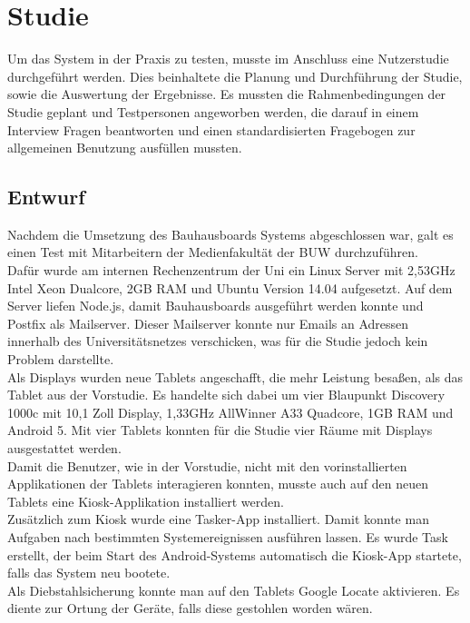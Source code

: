 \chapter{Studie}\label{Studie}
Um das System in der Praxis zu testen, musste im Anschluss eine Nutzerstudie durchgeführt werden.
Dies beinhaltete die Planung und Durchführung der Studie, sowie die Auswertung der Ergebnisse.
Es mussten die Rahmenbedingungen der Studie geplant und Testpersonen angeworben werden, die darauf in einem Interview Fragen beantworten und einen standardisierten Fragebogen zur allgemeinen Benutzung ausfüllen mussten.

\section{Entwurf}\label{Entwurf}
Nachdem die Umsetzung des Bauhausboards Systems abgeschlossen war, galt es einen Test mit Mitarbeitern der Medienfakultät der BUW durchzuführen.
\\
Dafür wurde am internen Rechenzentrum der Uni ein Linux Server mit 2,53GHz Intel Xeon Dualcore, 2GB RAM und Ubuntu Version 14.04 aufgesetzt.
Auf dem Server liefen Node.js, damit Bauhausboards ausgeführt werden konnte und Postfix als Mailserver.
Dieser Mailserver konnte nur Emails an Adressen innerhalb des Universitätsnetzes verschicken, was für die Studie jedoch kein Problem darstellte.
\\
Als Displays wurden neue Tablets angeschafft, die mehr Leistung besaßen, als das Tablet aus der Vorstudie.
Es handelte sich dabei um vier Blaupunkt Discovery 1000c mit 10,1 Zoll Display, 1,33GHz AllWinner A33 Quadcore, 1GB RAM und Android 5. Mit vier Tablets konnten für die Studie vier Räume mit Displays ausgestattet werden.
\\
Damit die Benutzer, wie in der Vorstudie, nicht mit den vorinstallierten Applikationen der Tablets interagieren konnten, musste auch auf den neuen Tablets eine Kiosk-Applikation installiert werden.
\\
Zusätzlich zum Kiosk wurde eine Tasker-App installiert.
Damit konnte man Aufgaben nach bestimmten Systemereignissen ausführen lassen.
Es wurde Task erstellt, der beim Start des Android-Systems automatisch die Kiosk-App startete, falls das System neu bootete.
\\
Als Diebstahlsicherung konnte man auf den Tablets Google Locate aktivieren.
Es diente zur Ortung der Geräte, falls diese gestohlen worden wären.

